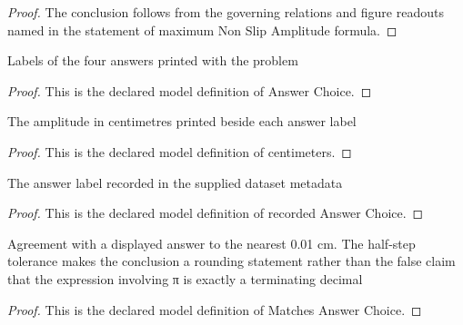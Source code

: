 \begin{proof}
  The conclusion follows from the governing relations and figure readouts named in the statement of maximum Non Slip Amplitude formula.
\end{proof}
\begin{definition}
  \label{def:physics:phyx-mini-0231:phyxminiproblems-problemphyxmini0231-answerchoice}
  Labels of the four answers printed with the problem
\end{definition}
\begin{proof}
  This is the declared model definition of Answer Choice.
\end{proof}
\begin{definition}[centimeters]
  \label{def:physics:phyx-mini-0231:phyxminiproblems-problemphyxmini0231-answerchoice-centimeters}
  The amplitude in centimetres printed beside each answer label
\end{definition}
\begin{proof}
  This is the declared model definition of centimeters.
\end{proof}
\begin{definition}
  \label{def:physics:phyx-mini-0231:phyxminiproblems-problemphyxmini0231-recordedanswerchoice}
  The answer label recorded in the supplied dataset metadata
\end{definition}
\begin{proof}
  This is the declared model definition of recorded Answer Choice.
\end{proof}
\begin{definition}
  \label{def:physics:phyx-mini-0231:phyxminiproblems-problemphyxmini0231-matchesanswerchoice}
  Agreement with a displayed answer to the nearest 0.01 cm. The half-step tolerance makes the conclusion a rounding statement rather than the false claim that the expression involving π is exactly a terminating decimal
\end{definition}
\begin{proof}
  This is the declared model definition of Matches Answer Choice.
\end{proof}

